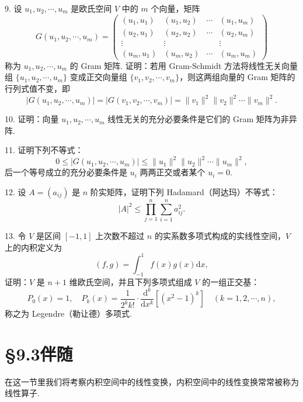 \documentclass[UTF8,12pt,a4paper,fontset=fandol]{ctexart}
\begin{document}
9. 设 $u_1,u_2,\cdots,u_m$ 是欧氏空间 $V$ 中的 $m$ 个向量，矩阵
\[
  G(u_1,u_2,\cdots,u_m)=
  \left(\begin{array}{cccc}
    (u_1,u_1) & (u_1,u_2) & \cdots & (u_1,u_m)\\
    (u_2,u_1) & (u_2,u_2) & \cdots & (u_2,u_m)\\
    \vdots & \vdots & & \vdots\\
    (u_m,u_1) & (u_m,u_2) & \cdots & (u_m,u_m)
  \end{array}\right)
\]
称为 $u_1,u_2,\cdots,u_m$ 的 Gram 矩阵. 证明：若用 Gram-Schmidt 方法将线性无关向量组 $\{u_1,u_2,\cdots,u_m\}$ 变成正交向量组 $\{v_1,v_2,\cdots,v_m\}$，则这两组向量的 Gram 矩阵的行列式值不变，即
\[
  |G(u_1,u_2,\cdots,u_m)|=|G(v_1,v_2,\cdots,v_m)|
  =\|v_1\|^2\|v_2\|^2\cdots\|v_m\|^2.
\]

10. 证明：向量 $u_1,u_2,\cdots,u_m$ 线性无关的充分必要条件是它们的 Gram 矩阵为非异阵.

11. 证明下列不等式：
\[
  0\le |G(u_1,u_2,\cdots,u_m)|\le \|u_1\|^2\|u_2\|^2\cdots\|u_m\|^2,
\]
后一个等号成立的充分必要条件是 $u_i$ 两两正交或者某个 $u_i=0$.

12. 设 $A=(a_{ij})$ 是 $n$ 阶实矩阵，证明下列 Hadamard（阿达玛）不等式：
\[
  |A|^2\le \prod_{j=1}^n\sum_{i=1}^n a_{ij}^2.
\]

13. 令 $V$ 是区间 $[-1,1]$ 上次数不超过 $n$ 的实系数多项式构成的实线性空间，$V$ 上的内积定义为
\[
  (f,g)=\int_{-1}^1 f(x)g(x)\mathrm dx,
\]
证明：$V$ 是 $n+1$ 维欧氏空间，并且下列多项式组成 $V$ 的一组正交基：
\[
  P_0(x)=1,\quad
  P_k(x)=\frac1{2^kk!}\cdot\frac{\mathrm d^k}{\mathrm dx^k}\left[(x^2-1)^k\right]\quad(k=1,2,\cdots,n),
\]
称之为 Legendre（勒让德）多项式.

\section*{§9.3\quad 伴\quad 随}

在这一节里我们将考察内积空间中的线性变换，内积空间中的线性变换常常被称为线性算子.
\end{document}
